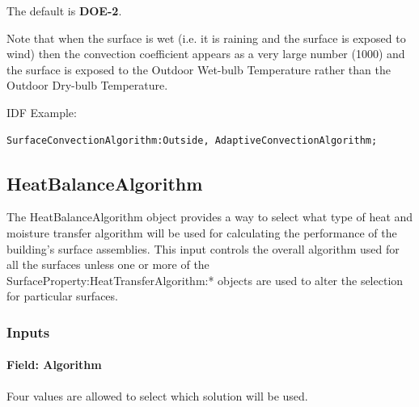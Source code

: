 The default is \textbf{DOE-2}.

Note that when the surface is wet (i.e. it is raining and the surface is exposed to wind) then the convection coefficient appears as a very large number (1000) and the surface is exposed to the Outdoor Wet-bulb Temperature rather than the Outdoor Dry-bulb Temperature.

IDF Example:

\begin{lstlisting}
SurfaceConvectionAlgorithm:Outside, AdaptiveConvectionAlgorithm;
\end{lstlisting}

\subsection{HeatBalanceAlgorithm}\label{heatbalancealgorithm}

The HeatBalanceAlgorithm object provides a way to select what type of heat and moisture transfer algorithm will be used for calculating the performance of the building's surface assemblies. This input controls the overall algorithm used for all the surfaces unless one or more of the SurfaceProperty:HeatTransferAlgorithm:* objects are used to alter the selection for particular surfaces.

\subsubsection{Inputs}\label{inputs-6-025}

\paragraph{Field: Algorithm}\label{field-algorithm-2-000}

Four values are allowed to select which solution will be used.

